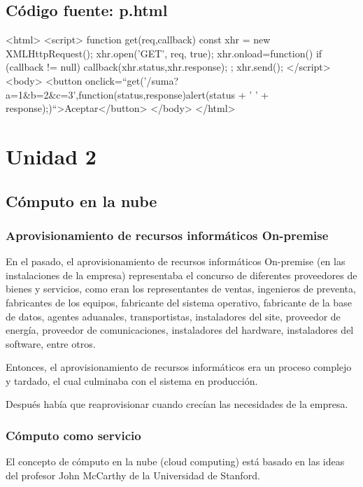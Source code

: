 \documentclass[11pt,a4paper,oneside]{book}
\begin{document}
\chapter{Código fuente: p.html}
\begin{SourceCode}
<html>
  <script>
    function get(req,callback)
    {
      const xhr = new XMLHttpRequest();
      xhr.open('GET', req, true);
      xhr.onload=function()
      {
        if (callback != null) callback(xhr.status,xhr.response);
      };
      xhr.send();
    }
  </script>
  <body>
    <button onclick=``get('/suma?a=1&b=2&c=3',function(status,response){alert(status + ' ' + response);})``>Aceptar</button>
  </body>
</html>
\end{SourceCode}

\part{Unidad 2}

\chapter{Cómputo en la nube}

\section{Aprovisionamiento de recursos informáticos On-premise}

En el pasado, el aprovisionamiento de recursos informáticos On-premise (en las instalaciones de la empresa) representaba el concurso de diferentes proveedores de bienes y servicios, como eran los representantes de ventas, ingenieros de preventa, fabricantes de los equipos, fabricante del sistema operativo, fabricante de la base de datos, agentes aduanales, transportistas, instaladores del site, proveedor de energía, proveedor de comunicaciones, instaladores del hardware, instaladores del software, entre otros.

Entonces, el aprovisionamiento de recursos informáticos era un proceso complejo y tardado, el cual culminaba con el sistema en producción.

Después había que reaprovisionar cuando crecían las necesidades de la empresa.

\section{Cómputo como servicio}

El concepto de cómputo en la nube (cloud computing) está basado en las ideas del profesor John McCarthy de la Universidad de Stanford.
\end{document}
